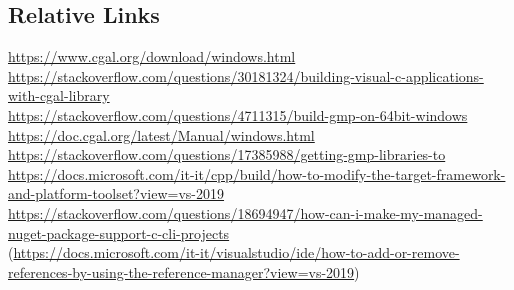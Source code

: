 \documentclass[11pt, english, openany]{report}
\begin{document}
\begin{appendices}
\subsection{Relative Links}
\href{https://www.cgal.org/download/windows.html}{https://www.cgal.org/download/windows.html}\\
\href{https://stackoverflow.com/questions/30181324/building-visual-c-applications-with-cgal-library}{https://stackoverflow.com/questions/30181324/building-visual-c-applications-with-cgal-library}\\
\href{https://stackoverflow.com/questions/4711315/build-gmp-on-64bit-windows}{https://stackoverflow.com/questions/4711315/build-gmp-on-64bit-windows}\\
\href{https://doc.cgal.org/latest/Manual/windows.html}{https://doc.cgal.org/latest/Manual/windows.html}\\
\href{https://stackoverflow.com/questions/17385988/getting-gmp-libraries-to}{https://stackoverflow.com/questions/17385988/getting-gmp-libraries-to}\\
\href{https://docs.microsoft.com/it-it/cpp/build/how-to-modify-the-target-framework-and-platform-toolset?view=vs-2019}{https://docs.microsoft.com/it-it/cpp/build/how-to-modify-the-target-framework-and-platform-toolset?view=vs-2019}\\
\href{https://stackoverflow.com/questions/18694947/how-can-i-make-my-managed-nuget-package-support-c-cli-projects}{https://stackoverflow.com/questions/18694947/how-can-i-make-my-managed-nuget-package-support-c-cli-projects}\\
(\href{https://docs.microsoft.com/it-it/visualstudio/ide/how-to-add-or-remove-references-by-using-the-reference-manager?view=vs-2019}{https://docs.microsoft.com/it-it/visualstudio/ide/how-to-add-or-remove-references-by-using-the-reference-manager?view=vs-2019})\\
	\end{appendices}
	

	
	
\end{document}
